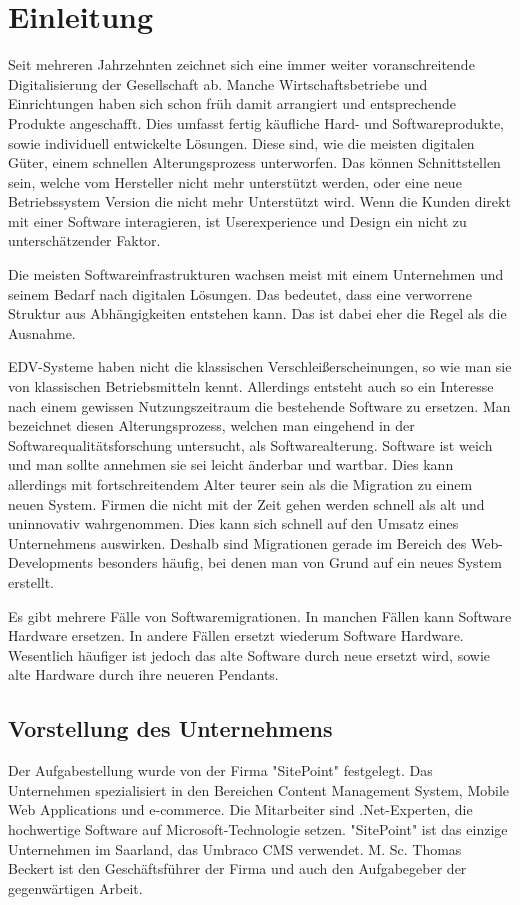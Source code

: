 \chapter{Einleitung}

Seit mehreren Jahrzehnten zeichnet sich eine immer weiter voranschreitende  Digitalisierung der Gesellschaft ab. Manche Wirtschaftsbetriebe und Einrichtungen haben sich schon früh damit arrangiert und entsprechende Produkte angeschafft. Dies umfasst fertig käufliche Hard- und Softwareprodukte, sowie individuell entwickelte Lösungen. Diese sind, wie die meisten digitalen Güter, einem schnellen Alterungsprozess unterworfen. Das können Schnittstellen sein, welche vom Hersteller nicht mehr unterstützt werden, oder eine neue Betriebssystem Version die nicht mehr Unterstützt wird. Wenn die Kunden direkt mit einer Software interagieren, ist Userexperience und Design ein nicht zu unterschätzender Faktor.

Die meisten Softwareinfrastrukturen wachsen meist mit einem Unternehmen und seinem Bedarf nach digitalen Lösungen. Das bedeutet, dass eine verworrene Struktur aus Abhängigkeiten entstehen kann. Das ist dabei eher die Regel als die Ausnahme.

\ac{EDV}-Systeme haben nicht die klassischen Verschleißerscheinungen, so wie man sie von klassischen Betriebsmitteln kennt. Allerdings entsteht auch so ein Interesse nach einem gewissen Nutzungszeitraum die bestehende Software zu ersetzen. Man bezeichnet diesen Alterungsprozess, welchen man eingehend in der Softwarequalitätsforschung untersucht, als Softwarealterung. Software ist \glqq weich\grqq{} und man sollte annehmen sie sei leicht änderbar und wartbar. Dies kann allerdings mit fortschreitendem Alter teurer sein als die Migration zu einem neuen System. Firmen die nicht mit der Zeit gehen werden schnell als alt und uninnovativ wahrgenommen. Dies kann sich schnell auf den Umsatz eines Unternehmens auswirken. Deshalb sind Migrationen gerade im Bereich des Web-Developments besonders häufig, bei denen man von Grund auf ein neues System erstellt.\cite{Wagner2014}

Es gibt mehrere Fälle von Softwaremigrationen. In manchen Fällen kann Software Hardware ersetzen. In andere Fällen ersetzt wiederum Software Hardware. Wesentlich häufiger ist jedoch das alte Software durch neue ersetzt wird, sowie alte Hardware durch ihre neueren Pendants. 

\section{Vorstellung des Unternehmens}
Der Aufgabestellung wurde von der Firma "SitePoint" festgelegt. Das Unternehmen spezialisiert in den Bereichen Content Management System, Mobile Web Applications und e-commerce. Die Mitarbeiter sind .Net-Experten, die hochwertige Software auf Microsoft-Technologie setzen. "SitePoint" ist das einzige Unternehmen im Saarland, das Umbraco CMS verwendet. M. Sc. Thomas Beckert ist den Geschäftsführer der Firma und auch den Aufgabegeber der gegenwärtigen Arbeit. \cite{SitePoint2018}  

